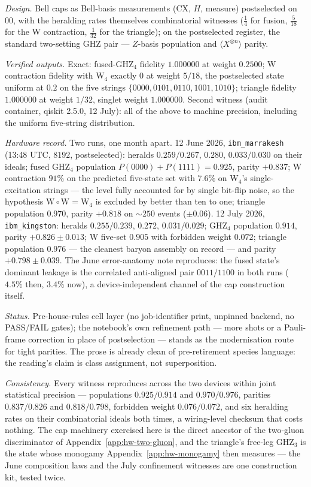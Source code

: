 \emph{Design.} Bell caps as Bell-basis measurements ($\mathrm{CX}$, $H$, measure) postselected on
$00$, with the heralding rates themselves combinatorial witnesses ($\tfrac14$ for fusion,
$\tfrac{5}{18}$ for the W contraction, $\tfrac{1}{32}$ for the triangle); on the postselected
register, the standard two-setting GHZ pair --- $Z$-basis population and
$\langle X^{\otimes n}\rangle$ parity.

\emph{Verified outputs.} Exact: fused-GHZ$_{4}$ fidelity $1.000000$ at weight $0.2500$; W
contraction fidelity with $\mathrm{W}_{4}$ exactly $0$ at weight $5/18$, the postselected state
uniform at $0.2$ on the five strings $\{0000, 0101, 0110, 1001, 1010\}$; triangle fidelity
$1.000000$ at weight $1/32$, singlet weight $1.000000$. Second witness (audit container, qiskit
2.5.0, 12 July): all of the above to machine precision, including the uniform five-string
distribution.

\emph{Hardware record.} Two runs, one month apart. 12 June 2026, \texttt{ibm\_marrakesh}
(13:48 UTC, $8192$, postselected): heralds $0.259/0.267$, $0.280$, $0.033/0.030$ on their
ideals; fused GHZ$_{4}$ population $P(0000){+}P(1111) = 0.925$, parity $+0.837$; W contraction
$91\%$ on the predicted five-state set with $7.6\%$ on $\mathrm{W}_{4}$'s single-excitation
strings --- the level fully accounted for by single bit-flip noise, so the hypothesis
$\mathrm{W}\circ\mathrm{W} = \mathrm{W}_{4}$ is excluded by better than ten to one; triangle
population $0.970$, parity $+0.818$ on ${\sim}250$ events ($\pm 0.06$). 12 July 2026,
\texttt{ibm\_kingston}: heralds $0.255/0.239$, $0.272$, $0.031/0.029$; GHZ$_{4}$ population
$0.914$, parity $+0.826 \pm 0.013$; W five-set $0.905$ with forbidden weight $0.072$; triangle
population $0.976$ --- the cleanest baryon assembly on record --- and parity
$+0.798 \pm 0.039$. The June error-anatomy note reproduces: the fused state's dominant leakage is
the correlated anti-aligned pair $0011/1100$ in both runs ($4.5\%$ then, $3.4\%$ now), a
device-independent channel of the cap construction itself.

\emph{Status.} Pre-house-rules cell layer (no job-identifier print, unpinned backend, no
PASS/FAIL gates); the notebook's own refinement path --- more shots or a Pauli-frame correction
in place of postselection --- stands as the modernisation route for tight parities. The prose is
already clean of pre-retirement species language: the reading's claim is class assignment, not
superposition.

\emph{Consistency.} Every witness reproduces across the two devices within joint statistical
precision --- populations $0.925/0.914$ and $0.970/0.976$, parities $0.837/0.826$ and
$0.818/0.798$, forbidden weight $0.076/0.072$, and six heralding rates on their combinatorial
ideals both times, a wiring-level checksum that costs nothing. The cap machinery exercised here
is the direct ancestor of the two-gluon discriminator of Appendix~\ref{app:hw-two-gluon}, and the
triangle's free-leg GHZ$_{3}$ is the state whose monogamy Appendix~\ref{app:hw-monogamy} then
measures --- the June composition laws and the July confinement witnesses are one construction
kit, tested twice.

